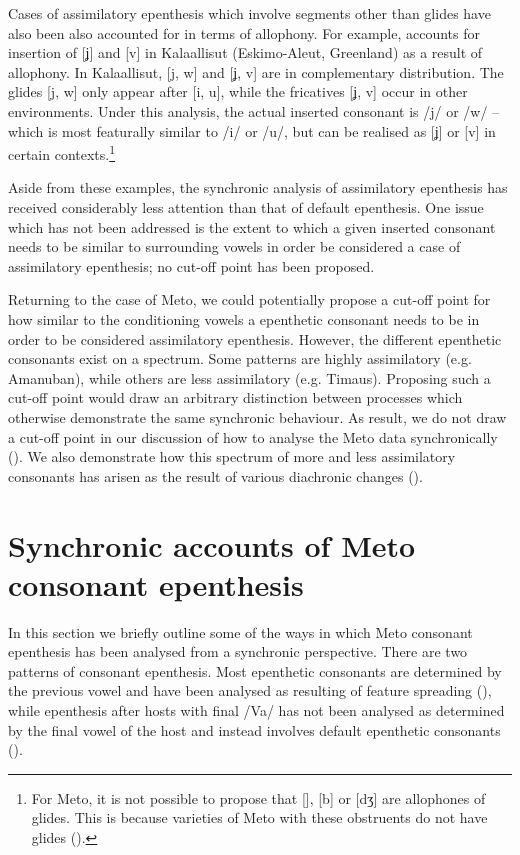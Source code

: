 \documentclass[output=paper]{langscibook}
\begin{document}
Cases of assimilatory epenthesis which involve 
segments other than glides have also been 
also accounted for in terms of allophony.
For example, \citet[78]{st14} accounts for 
insertion of [ʝ] and [v] in Kalaallisut (Eskimo-Aleut, Greenland) as a result of allophony.
In Kalaallisut, [j, w] and [ʝ, v]  are in complementary distribution.
The glides [j, w] only appear after [i, u],
while the fricatives [ʝ, v] occur in other environments.
Under this analysis, the actual inserted consonant is /j/ or /w/  -- which 
is most featurally similar to /i/ or /u/, but can be realised as [ʝ] or [v] in 
certain contexts.\footnote{%
		For Meto, it is not possible to propose that
		[\gw], [b] or [dʒ] are allophones of glides.
		This is because varieties of Meto with these
		obstruents do not have glides ().}

Aside from these examples,
the synchronic analysis of assimilatory epenthesis has received considerably
less attention than that of default epenthesis.
One issue which has not been addressed is 
the extent to which a given inserted consonant needs to be similar to surrounding vowels in order be 
considered a case of assimilatory epenthesis; no cut-off point has been proposed.

Returning to the case of Meto,
we could potentially 
propose a cut-off point for how similar to the conditioning 
vowels a epenthetic consonant needs to be in order to be considered assimilatory epenthesis. 
However, the different epenthetic consonants exist on a spectrum.
Some patterns are highly assimilatory (e.g. Amanuban), while others are less assimilatory (e.g. Timaus).
Proposing such a cut-off point would draw an arbitrary
distinction between processes which otherwise
demonstrate the same synchronic behaviour. 
As result, we do not draw a cut-off point in our  discussion of 
how to analyse the Meto data synchronically ().
We also 
demonstrate how this  spectrum of more and less assimilatory 
consonants has arisen as the result of various diachronic changes ().

\section{Synchronic accounts of  Meto consonant epenthesis}\label{sec:SyncAccount}
In this section we briefly outline some of the ways
in which Meto consonant epenthesis
has been analysed from a synchronic perspective.
There are two patterns of consonant epenthesis.
Most epenthetic consonants are determined by the previous vowel
and have been analysed as resulting of feature spreading (),
while epenthesis after hosts with final /Va/ has not been
analysed as determined by the final vowel of the host
and instead involves default epenthetic consonants ().
\end{document}
